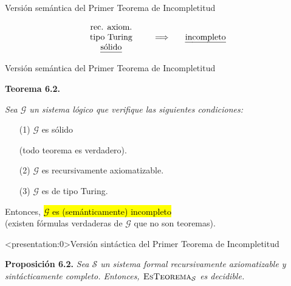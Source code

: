 \documentclass[10pt,xcolor=dvipsnames,aspectratio=169,spanish]{beamer}
\makeatletter
\let\HL\hl
\renewcommand\hl{%
  \let\set@color\beamerorig@set@color
  \let\reset@color\beamerorig@reset@color
  \HL}
\makeatother
\begin{document}
\begin{frame}{Versión semántica del Primer Teorema de Incompletitud}

{\Large
$$\begin{matrix}
    \begin{matrix}
        \text{rec. axiom.} \\
        \text{tipo Turing} \\
        \text{\ul{sólido}} \\
    \end{matrix}
    & \;\;\;\;\;\;\Longrightarrow\;\;\;\;\;\;
    \begin{matrix}
        \text{\ul{incompleto}} \\
    \end{matrix}
\end{matrix}$$
}

\end{frame}



\begin{frame}{Versión semántica del Primer Teorema de Incompletitud}

\textbf{Teorema 6.2.} {\itshape
Sea $\mathcal{G}$ un sistema lógico que verifique las siguientes condiciones:
\begin{itemize}
    \item[(1)] $\mathcal{G}$ es sólido
    
    (todo teorema es verdadero).
    \item[(2)] $\mathcal{G}$ es recursivamente axiomatizable.
    \item[(3)] $\mathcal{G}$ es de tipo Turing.
\end{itemize}
Entonces, \hl{$\mathcal{G}$ es (semánticamente) incompleto}\\
(existen fórmulas verdaderas de $\mathcal{G}$ que no son teoremas).
}

\end{frame}


\begin{frame}<presentation:0>{Versión sintáctica del Primer Teorema de Incompletitud}

\textbf{Proposición 6.2.} {\itshape
Sea $\mathcal{S}$ un sistema formal recursivamente axiomatizable y sintácticamente completo. Entonces, $\textsc{EsTeorema}_\mathcal{S}$ es decidible.
}

\end{frame}
\end{document}
